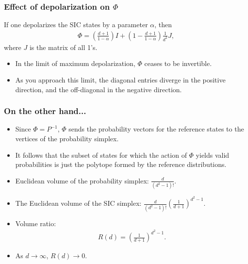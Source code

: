 \documentclass{beamer}
\begin{document}
\begin{frame}
\frametitle{Effect of depolarization on $\Phi$}
If one depolarizes the SIC states by a parameter $\alpha$, then
\begin{align}
\Phi = \left(\frac{d+1}{1-\alpha}\right)I + \left(1-\frac{d+1}{1-\alpha}\right)\frac{1}{d^2}J,	
\end{align}
	where $J$ is the matrix of all 1's.
	\begin{itemize}
	\item 	In the limit of maximum depolarization, $\Phi$ ceases to be invertible. 
	\item As you approach this limit, the diagonal entries diverge in the positive direction, and the off-diagonal in the negative direction.
	\end{itemize}
\end{frame}


\begin{frame}
\frametitle{On the other hand...}
\begin{itemize}
\item Since $\Phi= P^{-1}$, $\Phi$ sends the probability vectors for the reference states to the vertices of the probability simplex.
\item It follows that the subset of states for which the action of $\Phi$ yields valid probabilities is just the polytope formed by the reference distributions.
\item Euclidean volume of the probability simplex: $\frac{d}{(d^2-1)!}$.
\item The Euclidean volume of the SIC simplex: $\frac{d}{(d^2-1)!}\left(\frac{1}{d+1}\right)^{d^2-1}$. 
\item Volume ratio:
\begin{align}
R(d) = \left(\frac{1}{d+1}\right)^{d^2-1}	.
\end{align}
\item 
As $d\rightarrow \infty$, $R(d)\rightarrow 0$.
\end{itemize}
\end{frame}
\end{document}
